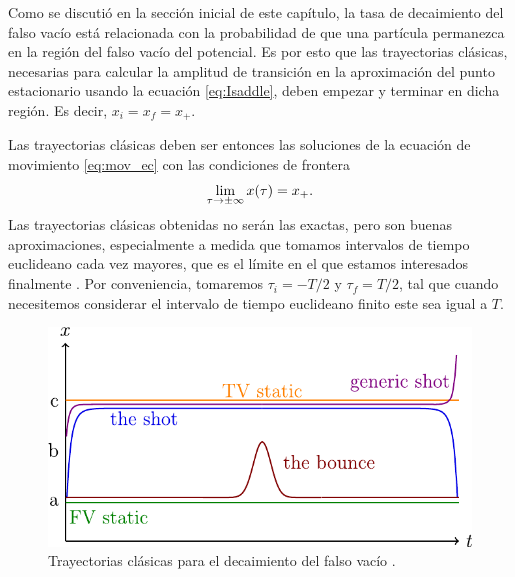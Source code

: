 Como se discutió en la sección inicial de este capítulo, la tasa de decaimiento del falso vacío está relacionada con la probabilidad de que una partícula permanezca en la región del falso vacío del potencial. %
Es por esto que las trayectorias clásicas, necesarias para calcular la amplitud de transición en la aproximación del punto estacionario usando la ecuación \eqref{eq:Isaddle}, deben empezar y terminar en dicha región. Es decir, $x_i = x_f = x_+$. 
%

Las trayectorias clásicas deben ser entonces las soluciones de la ecuación de movimiento \eqref{eq:mov_ec} con las condiciones de frontera \cite{coleman1977fate}
\begin{equation} \label{eq:cond_frontera}
	\lim_{\tau \rightarrow \pm\infty} x\qty(\tau) = x_+.
\end{equation} 
Las trayectorias clásicas obtenidas no serán las exactas, pero son buenas aproximaciones, especialmente a medida que tomamos intervalos de tiempo euclideano cada vez mayores, que es el límite en el que estamos interesados finalmente \cite{paranjape2017theory, callan1977fate}. Por conveniencia, tomaremos $\tau_i = -T/2$ y $\tau_f = T/2$, tal que cuando necesitemos considerar el intervalo de tiempo euclideano finito este sea igual a $T$. 

\begin{figure}[t]
	\centering
	\includegraphics[scale=0.375]{FIGURAS/soluciones}
	\caption{Trayectorias clásicas para el decaimiento del falso vacío \cite{andreassen2017precision}. 
	}
	\label{fig:soluciones}
\end{figure}

